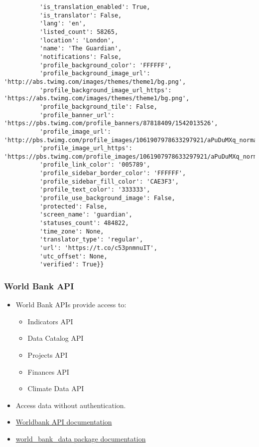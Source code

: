\begin{frame}[fragile]
\begin{verbatim}
          'is_translation_enabled': True,
          'is_translator': False,
          'lang': 'en',
          'listed_count': 58265,
          'location': 'London',
          'name': 'The Guardian',
          'notifications': False,
          'profile_background_color': 'FFFFFF',
          'profile_background_image_url': 'http://abs.twimg.com/images/themes/theme1/bg.png',
          'profile_background_image_url_https': 'https://abs.twimg.com/images/themes/theme1/bg.png',
          'profile_background_tile': False,
          'profile_banner_url': 'https://pbs.twimg.com/profile_banners/87818409/1542013526',
          'profile_image_url': 'http://pbs.twimg.com/profile_images/1061907978633297921/aPuDuMXq_normal.jpg',
          'profile_image_url_https': 'https://pbs.twimg.com/profile_images/1061907978633297921/aPuDuMXq_normal.jpg',
          'profile_link_color': '005789',
          'profile_sidebar_border_color': 'FFFFFF',
          'profile_sidebar_fill_color': 'CAE3F3',
          'profile_text_color': '333333',
          'profile_use_background_image': False,
          'protected': False,
          'screen_name': 'guardian',
          'statuses_count': 484822,
          'time_zone': None,
          'translator_type': 'regular',
          'url': 'https://t.co/c53pnmnuIT',
          'utc_offset': None,
          'verified': True}}
\end{verbatim}

\end{frame}


\begin{frame}
    \frametitle{World Bank API}
    \begin{itemize}
        \item World Bank APIs provide access to:
        \begin{itemize}
            \item Indicators API
            \item Data Catalog API
            \item Projects API
            \item Finances API
            \item Climate Data API
        \end{itemize}
        \item Access data without authentication.
        \item \href{https://datahelpdesk.worldbank.org/knowledgebase/articles/889386-developer-information-overview}{Worldbank API documentation}
        \item \href{https://github.com/mwouts/world_bank_data}{world\_bank\_data package documentation}
    \end{itemize}
\end{frame}

